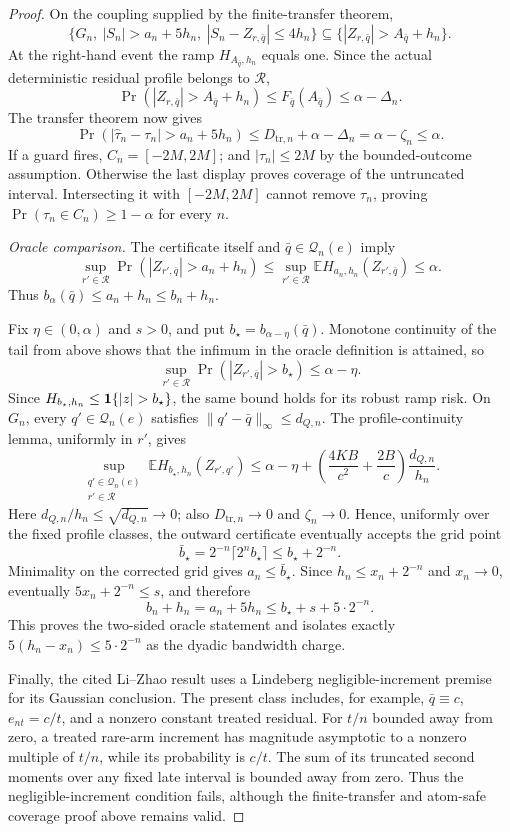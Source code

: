 \documentclass{article}
\begin{document}
\begin{proof}
On the coupling supplied by the finite-transfer theorem,
\[
 \{G_n,\ |S_n|>a_n+5h_n,\ |S_n-Z_{r,\bar q}|\leq4h_n\}
 \subseteq\{|Z_{r,\bar q}|>A_{\bar q}+h_n\}.
\]
At the right-hand event the ramp \(H_{A_{\bar q},h_n}\) equals one.  Since the actual deterministic residual profile belongs to \(\mathcal R\),
\[
 \Pr(|Z_{r,\bar q}|>A_{\bar q}+h_n)
 \leq F_{\bar q}(A_{\bar q})
 \leq\alpha-\Delta_n.
\]
The transfer theorem now gives
\[
 \Pr(|\widehat\tau_n-\tau_n|>a_n+5h_n)
 \leq D_{\mathrm{tr},n}+\alpha-\Delta_n
 =\alpha-\zeta_n\leq\alpha.
\]
If a guard fires, \(C_n=[-2M,2M]\); and
\(|\tau_n|\leq2M\) by the bounded-outcome assumption.  Otherwise the last display proves coverage of the untruncated interval.  Intersecting it with
\([-2M,2M]\) cannot remove \(\tau_n\), proving
\(\Pr(\tau_n\in C_n)\geq1-\alpha\) for every \(n\).

\emph{Oracle comparison.}
The certificate itself and \(\bar q\in\mathcal Q_n(e)\) imply
\[
 \sup_{r'\in\mathcal R}
 \Pr(|Z_{r',\bar q}|>a_n+h_n)
 \leq\sup_{r'\in\mathcal R}
 \mathbb EH_{a_n,h_n}(Z_{r',\bar q})
 \leq\alpha.
\]
Thus \(b_\alpha(\bar q)\leq a_n+h_n\leq b_n+h_n\).

Fix \(\eta\in(0,\alpha)\) and \(s>0\), and put
\(b_\star=b_{\alpha-\eta}(\bar q)\).
Monotone continuity of the tail from above shows that the infimum in the oracle definition is attained, so
\[
 \sup_{r'\in\mathcal R}\Pr(|Z_{r',\bar q}|>b_\star)
 \leq\alpha-\eta.
\]
Since \(H_{b_\star,h_n}\leq{\bf1}\{|z|>b_\star\}\), the same bound holds for its robust ramp risk.  On \(G_n\), every \(q'\in\mathcal Q_n(e)\) satisfies
\(\|q'-\bar q\|_\infty\leq d_{Q,n}\).  The profile-continuity lemma, uniformly in \(r'\), gives
\[
 \sup_{\substack{q'\in\mathcal Q_n(e)\\r'\in\mathcal R}}
 \mathbb EH_{b_\star,h_n}(Z_{r',q'})
 \leq\alpha-\eta+
 \left(\frac{4KB}{c^2}+\frac{2B}{c}\right)\frac{d_{Q,n}}{h_n}.
\]
Here \(d_{Q,n}/h_n\leq\sqrt{d_{Q,n}}\to0\);
also \(D_{\mathrm{tr},n}\to0\) and \(\zeta_n\to0\).
Hence, uniformly over the fixed profile classes, the outward certificate eventually accepts the grid point
\[
 \bar b_\star=2^{-n}\lceil2^n b_\star\rceil
 \leq b_\star+2^{-n}.
\]
Minimality on the corrected grid gives \(a_n\leq\bar b_\star\).  Since
\(h_n\leq x_n+2^{-n}\) and \(x_n\to0\), eventually
\(5x_n+2^{-n}\leq s\), and therefore
\[
 b_n+h_n=a_n+5h_n
 \leq b_\star+s+5\cdot2^{-n}.
\]
This proves the two-sided oracle statement and isolates exactly
\(5(h_n-x_n)\leq5\cdot2^{-n}\) as the dyadic bandwidth charge.

Finally, the cited Li--Zhao result uses a Lindeberg negligible-increment premise for its Gaussian conclusion.  The present class includes, for example,
\(\bar q\equiv c\), \(e_{nt}=c/t\), and a nonzero constant treated residual.
For \(t/n\) bounded away from zero, a treated rare-arm increment has magnitude asymptotic to a nonzero multiple of \(t/n\), while its probability is \(c/t\).
The sum of its truncated second moments over any fixed late interval is bounded away from zero.  Thus the negligible-increment condition fails, although the finite-transfer and atom-safe coverage proof above remains valid.
\end{proof}
\end{document}
